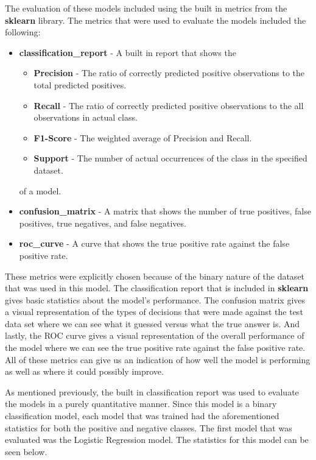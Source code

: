 The evaluation of these models included using the built in metrics from the \textbf{sklearn} library. The metrics that were used to evaluate the models included the following:

\begin{itemize}
    \item \textbf{classification\_report} - A built in report that shows the
    \begin{itemize}
        \item \textbf{Precision} - The ratio of correctly predicted positive observations to the total predicted positives.
        \item \textbf{Recall} - The ratio of correctly predicted positive observations to the all observations in actual class.
        \item \textbf{F1-Score} - The weighted average of Precision and Recall.
        \item \textbf{Support} - The number of actual occurrences of the class in the specified dataset.
    \end{itemize}
    of a model.
    \item \textbf{confusion\_matrix} - A matrix that shows the number of true positives, false positives, true negatives, and false negatives.
    \item \textbf{roc\_curve} - A curve that shows the true positive rate against the false positive rate.
\end{itemize}

These metrics were explicitly chosen because of the binary nature of the dataset that was used in this model. The classification report that is included in \textbf{sklearn} gives basic statistics about the model's
performance. The confusion matrix gives a visual representation of the types of decisions that were made against the test data set where we can see what it guessed versus what the true answer is. And lastly, the ROC curve
gives a visual representation of the overall performance of the model where we can see the true positive rate against the false positive rate. All of these metrics can give us an indication of how well the model is performing
as well as where it could possibly improve.


As mentioned previously, the built in classification report was used to evaluate the models in a purely quantitative manner. Since this  model is a binary classification model, each model that was trained had the aforementioned
statistics for both the positive and negative classes. The first model that was evaluated was the Logistic Regression model. The statistics for this model can be seen below.

